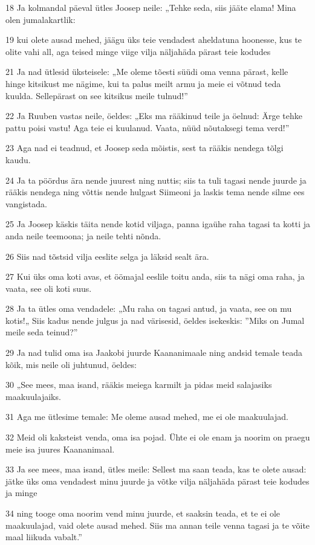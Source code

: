 \par 18 Ja kolmandal päeval ütles Joosep neile: „Tehke seda, siis jääte elama! Mina olen jumalakartlik:
\par 19 kui olete ausad mehed, jäägu üks teie vendadest aheldatuna hoonesse, kus te olite vahi all, aga teised minge viige vilja näljahäda pärast teie kodudes
\par 21 Ja nad ütlesid üksteisele: „Me oleme tõesti süüdi oma venna pärast, kelle hinge kitsikust me nägime, kui ta palus meilt armu ja meie ei võtnud teda kuulda. Sellepärast on see kitsikus meile tulnud!”
\par 22 Ja Ruuben vastas neile, öeldes: „Eks ma rääkinud teile ja öelnud: Ärge tehke pattu poisi vastu! Aga teie ei kuulanud. Vaata, nüüd nõutaksegi tema verd!”
\par 23 Aga nad ei teadnud, et Joosep seda mõistis, sest ta rääkis nendega tõlgi kaudu.
\par 24 Ja ta pöördus ära nende juurest ning nuttis; siis ta tuli tagasi nende juurde ja rääkis nendega ning võttis nende hulgast Siimeoni ja laskis tema nende silme ees vangistada.
\par 25 Ja Joosep käskis täita nende kotid viljaga, panna igaühe raha tagasi ta kotti ja anda neile teemoona; ja neile tehti nõnda.
\par 26 Siis nad tõstsid vilja eeslite selga ja läksid sealt ära.
\par 27 Kui üks oma koti avas, et öömajal eeslile toitu anda, siis ta nägi oma raha, ja vaata, see oli koti suus.
\par 28 Ja ta ütles oma vendadele: „Mu raha on tagasi antud, ja vaata, see on mu kotis!„ Siis kadus nende julgus ja nad värisesid, öeldes isekeskis: ”Miks on Jumal meile seda teinud?”
\par 29 Ja nad tulid oma isa Jaakobi juurde Kaananimaale ning andsid temale teada kõik, mis neile oli juhtunud, öeldes:
\par 30 „See mees, maa isand, rääkis meiega karmilt ja pidas meid salajasiks maakuulajaiks.
\par 31 Aga me ütlesime temale: Me oleme ausad mehed, me ei ole maakuulajad.
\par 32 Meid oli kaksteist venda, oma isa pojad. Ühte ei ole enam ja noorim on praegu meie isa juures Kaananimaal.
\par 33 Ja see mees, maa isand, ütles meile: Sellest ma saan teada, kas te olete ausad: jätke üks oma vendadest minu juurde ja võtke vilja näljahäda pärast teie kodudes ja minge
\par 34 ning tooge oma noorim vend minu juurde, et saaksin teada, et te ei ole maakuulajad, vaid olete ausad mehed. Siis ma annan teile venna tagasi ja te võite maal liikuda vabalt.”
